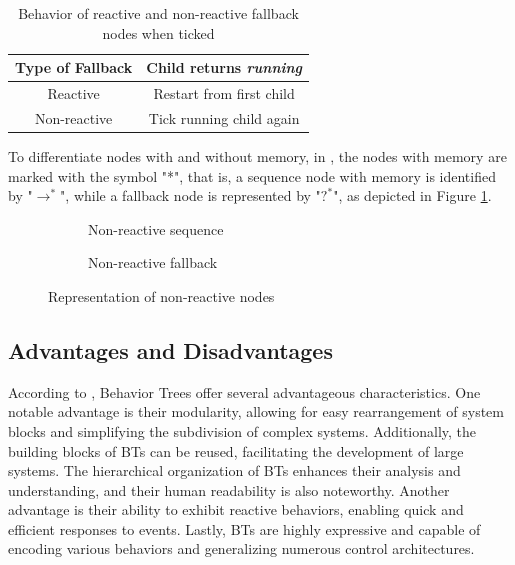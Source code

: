 \begin{table}[h]
    \centering
    \begin{tabular}{c c}
        \toprule
        Type of Fallback & Child returns \textit{running} \\
        \midrule
        Reactive         & Restart from first child       \\
        Non-reactive     & Tick running child again       \\
        \bottomrule
    \end{tabular}
    \caption{Behavior of reactive and non-reactive fallback nodes when ticked}
    \label{tab:fallback_reactivity}
\end{table}

To differentiate nodes with and without memory, in \cite{BTsInRobotics}, the nodes with memory are marked with the symbol "*", that is, a sequence node with memory is identified by "$\rightarrow^*$", while a fallback node is represented by "$?^*$", as depicted in Figure \ref{fig:background_non_reactive_nodes}.

\begin{figure}[!h]
    \centering
    \begin{subfigure}[b]{.49\linewidth}
        \centering
        \scalebox{1.0} {
            \begin{forest}
            \end{forest}
        }
        \caption{Non-reactive sequence}
    \end{subfigure}
    \hfill
    \begin{subfigure}[b]{.49\linewidth}
        \centering
        \scalebox{1.0} {
            \begin{forest}
            \end{forest}
        }
        \caption{Non-reactive fallback}
    \end{subfigure}
    \caption{Representation of non-reactive nodes}
    \label{fig:background_non_reactive_nodes}
\end{figure}

\subsection{Advantages and Disadvantages}

According to \cite{BTsInRobotics}, Behavior Trees offer several advantageous characteristics. One notable advantage is their modularity, allowing for easy rearrangement of system blocks and simplifying the subdivision of complex systems. Additionally, the building blocks of BTs can be reused, facilitating the development of large systems. The hierarchical organization of BTs enhances their analysis and understanding, and their human readability is also noteworthy. Another advantage is their ability to exhibit reactive behaviors, enabling quick and efficient responses to events. Lastly, BTs are highly expressive and capable of encoding various behaviors and generalizing numerous control architectures.

